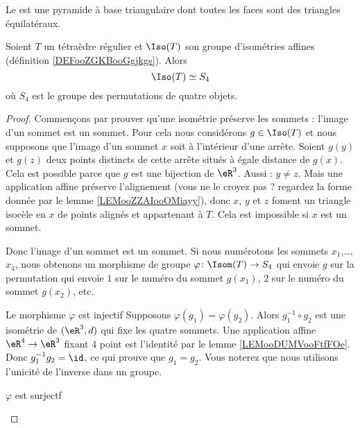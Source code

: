 Le  est une pyramide à base triangulaire dont toutes les faces sont des triangles équilatéraux.

\begin{proposition}       \label{PROPooVNLKooOjQzCj}
    Soient \( T\) un tétraèdre régulier et \( \Iso(T)\) son groupe d'isométries affines (définition \ref{DEFooZGKBooGgjkgs}). Alors
    \begin{equation}
        \Iso(T)\simeq S_4
    \end{equation}
    où \( S_4\) est le groupe des permutations de quatre objets.
\end{proposition}

\begin{proof}
    Commençons par prouver qu'une isométrie préserve les sommets : l'image d'un sommet est un sommet. Pour cela nous considérons \( g\in \Iso(T)\) et nous supposons que l'image d'un sommet \( x\) soit à l'intérieur d'une arrête. Soient \( g(y)\) et \( g(z)\) deux points distincts de cette arrête situés à égale distance de \( g(x)\). Cela est possible parce que \( g\) est une bijection de \( \eR^3\). Aussi : \( y\neq z\). Mais une application affine préserve l'alignement (vous ne le croyez pas  ? regardez la forme donnée par le lemme \eqref{LEMooZZAIooOMiayy}), donc \( x\), \( y\) et \( z\) foment un triangle isocèle en \( x\) de points alignés et appartenant à \( T\). Cela est impossible si \( x\) est un sommet.

    Donc l'image d'un sommet est un sommet. Si nous numérotons les sommets \( x_1\),\ldots, \( x_4\), nous obtenons un morphisme de groupe \( \varphi\colon \Isom(T) \to S_4\) qui envoie \( g\) sur la permutation qui envoie \( 1\) sur le numéro du sommet \( g(x_1)\), \( 2\) sur le numéro du sommet \( g(x_2)\), etc.

    \begin{subproof}
    \item[Le morphisme \( \varphi\) est injectif]
        Supposons \( \varphi(g_1)=\varphi(g_2)\). Alors \( g_1^{-1}\circ g_2\) est une isométrie de \( (\eR^3,d)\) qui fixe les quatre sommets. Une application affine \( \eR^4\to\eR^3\) fixant \( 4\) point est l'identité par le lemme \ref{LEMooDUMVooFtfFOe}. Donc \( g_1^{-1}g_2=\id\), ce qui prouve que \( g_1=g_2\). Vous noterez que nous utilisons l'unicité de l'inverse dans un groupe.

    \item[\( \varphi\) est surjectf]


\end{subproof}
\end{proof}
